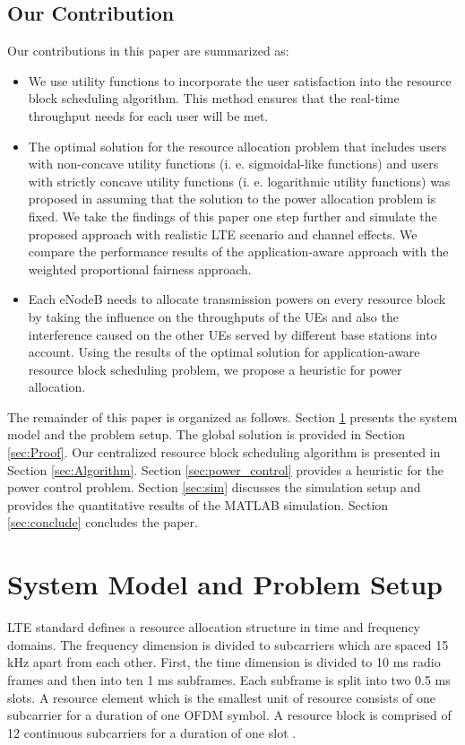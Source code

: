 \documentclass[journal]{IEEEtran} 				\IEEEoverridecommandlockouts 	\usepackage{amsmath,amssymb}
\begin{document}
\subsection{Our Contribution}\label{sec:contribution}
Our contributions in this paper are summarized as:
\begin{itemize}
  \item We use utility functions to incorporate the user satisfaction into the resource block scheduling algorithm. This method ensures that the real-time throughput needs for each user will be met. 
  \item The optimal solution for the resource allocation problem that includes users with non-­concave utility functions (i. e. sigmoidal-like functions) and users with strictly concave utility functions (i. e. logarithmic utility functions) was proposed in \cite{Erpek} assuming that the solution to the power allocation problem is fixed. We take the findings of this paper one step further and simulate the proposed approach with realistic LTE scenario and channel effects. We compare the performance results of the application-aware approach with the weighted proportional fairness approach. 
  \item Each eNodeB needs  to allocate transmission powers on every resource block by taking the influence on the throughputs of the UEs and also the interference caused on the other UEs served by different base stations into account. Using the results of the optimal solution for application-aware resource block scheduling problem, we propose a heuristic for power allocation.
\end{itemize}


The remainder of this paper is organized as follows. Section \ref{sec:Problem_formulation} presents the system model and the problem setup. The global solution is provided in Section \ref{sec:Proof}. Our centralized resource block scheduling algorithm is presented in Section \ref{sec:Algorithm}. Section \ref{sec:power_control} provides a heuristic for the power control problem. Section \ref{sec:sim} discusses the simulation setup and provides the quantitative results of the MATLAB simulation. Section \ref{sec:conclude} concludes the paper.
\section{System Model and Problem Setup}\label{sec:Problem_formulation}

LTE standard defines a resource allocation structure in time and frequency domains. The frequency dimension is divided to subcarriers which are spaced 15 kHz apart from each other. First, the time dimension is divided to 10 ms radio frames and then into ten 1 ms subframes. Each subframe is split into two 0.5 ms slots. A resource element which is the smallest unit of resource consists of one subcarrier for a duration of one OFDM symbol. A resource block is comprised of 12 continuous subcarriers for a duration of one slot \cite{LTEBook}. 
\end{document}
